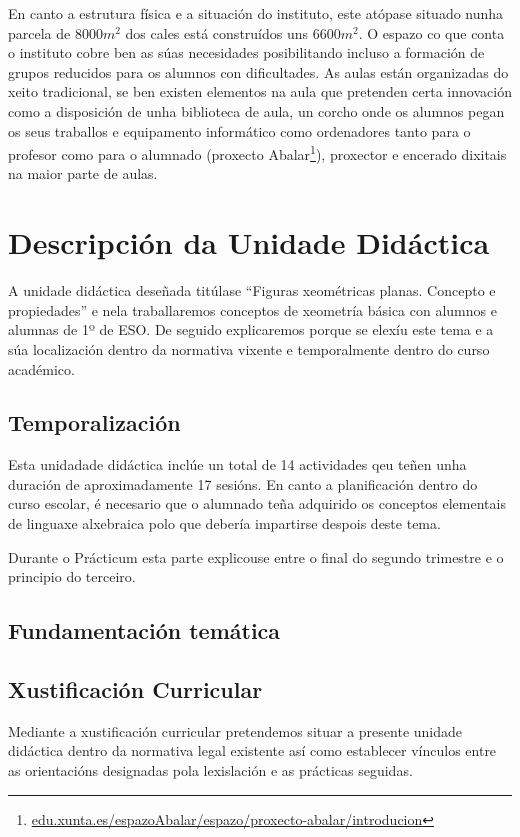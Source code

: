 En canto a estrutura física e a situación do instituto, este atópase situado nunha parcela de $8000 m^2$ dos cales está construídos uns $6600 m^2$. O espazo co que conta o instituto cobre ben as súas necesidades posibilitando incluso a formación de grupos reducidos para os alumnos con dificultades. As aulas están organizadas do xeito tradicional, se ben existen elementos na aula que pretenden certa innovación como a disposición de unha biblioteca de aula, un corcho onde os alumnos pegan os seus traballos e equipamento informático como ordenadores tanto para o profesor como para o alumnado (proxecto Abalar\footnote{\href{https://www.edu.xunta.es/espazoAbalar/espazo/proxecto-abalar/introducion}{edu.xunta.es/espazoAbalar/espazo/proxecto-abalar/introducion}}), proxector e encerado dixitais na maior parte de aulas.


\section{Descripción da Unidade Didáctica}
A unidade didáctica deseñada titúlase ``Figuras xeométricas planas. Concepto e propiedades'' e nela traballaremos conceptos de xeometría básica con alumnos e alumnas de 1º de ESO. De seguido explicaremos porque se elexíu este tema e a súa localización dentro da normativa vixente e temporalmente dentro do curso académico.

\subsection{Temporalización}
Esta unidadade didáctica inclúe un total de 14 actividades qeu teñen unha duración de aproximadamente 17 sesións. En canto a planificación dentro do curso escolar, é necesario que o alumnado teña adquirido os conceptos elementais de linguaxe alxebraica polo que debería impartirse despois deste tema.

Durante o Prácticum esta parte explicouse entre o final do segundo trimestre e o principio do terceiro.

\subsection{Fundamentación temática}

\subsection{Xustificación Curricular}
Mediante a xustificación curricular pretendemos situar a presente unidade didáctica dentro da normativa legal existente así como establecer vínculos entre as orientacións designadas pola lexislación e as prácticas seguidas.

